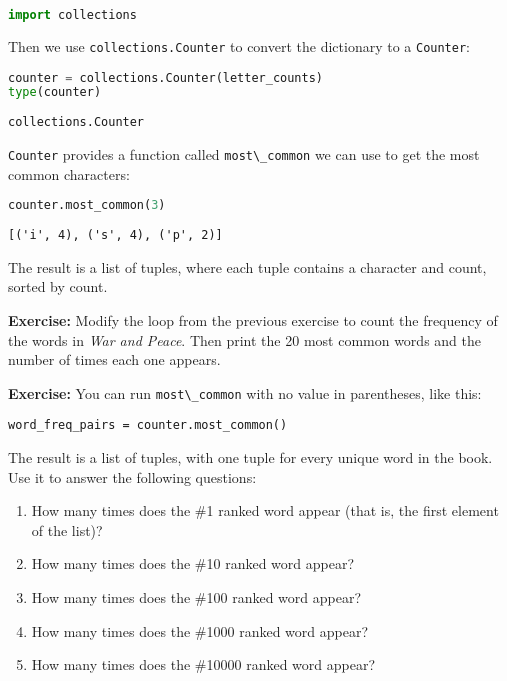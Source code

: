 \begin{lstlisting}[language=Python,style=source]
import collections
\end{lstlisting}

Then we use \passthrough{\lstinline!collections.Counter!} to convert the
dictionary to a \passthrough{\lstinline!Counter!}:

\begin{lstlisting}[language=Python,style=source]
counter = collections.Counter(letter_counts)
type(counter)
\end{lstlisting}

\begin{lstlisting}[style=output]
collections.Counter
\end{lstlisting}

\passthrough{\lstinline!Counter!} provides a function called
\passthrough{\lstinline!most\_common!} we can use to get the most common
characters:

\begin{lstlisting}[language=Python,style=source]
counter.most_common(3)
\end{lstlisting}

\begin{lstlisting}[style=output]
[('i', 4), ('s', 4), ('p', 2)]
\end{lstlisting}

The result is a list of tuples, where each tuple contains a character
and count, sorted by count.

\textbf{Exercise:} Modify the loop from the previous exercise to count
the frequency of the words in \emph{War and Peace}. Then print the 20
most common words and the number of times each one appears.

\textbf{Exercise:} You can run \passthrough{\lstinline!most\_common!}
with no value in parentheses, like this:

\begin{lstlisting}[style=output]
word_freq_pairs = counter.most_common()
\end{lstlisting}

The result is a list of tuples, with one tuple for every unique word in
the book. Use it to answer the following questions:

\begin{enumerate}
\def\labelenumi{\arabic{enumi}.}
\item
  How many times does the \#1 ranked word appear (that is, the first
  element of the list)?
\item
  How many times does the \#10 ranked word appear?
\item
  How many times does the \#100 ranked word appear?
\item
  How many times does the \#1000 ranked word appear?
\item
  How many times does the \#10000 ranked word appear?
\end{enumerate}

